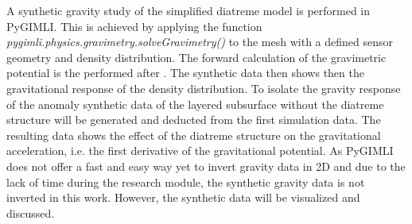 A synthetic gravity study of the simplified diatreme model is performed in PyGIMLI. This is achieved by applying the function \textit{pygimli.physics.gravimetry.solveGravimetry()} to the mesh with a defined sensor geometry and density distribution. The forward calculation of the gravimetric potential is the performed after \citet{won1987computing}. The synthetic data then shows then the gravitational response of the density distribution. To isolate the gravity response of the anomaly synthetic data of the layered subsurface without the diatreme structure will be generated and deducted from the first simulation data. The resulting data shows the effect of the diatreme structure on the gravitational acceleration, i.e. the first derivative of the gravitational potential. As PyGIMLI does not offer a fast and easy way yet to invert gravity data in 2D and due to the lack of time during the research module, the synthetic gravity data is not inverted in this work. However, the synthetic data will be visualized and discussed.


